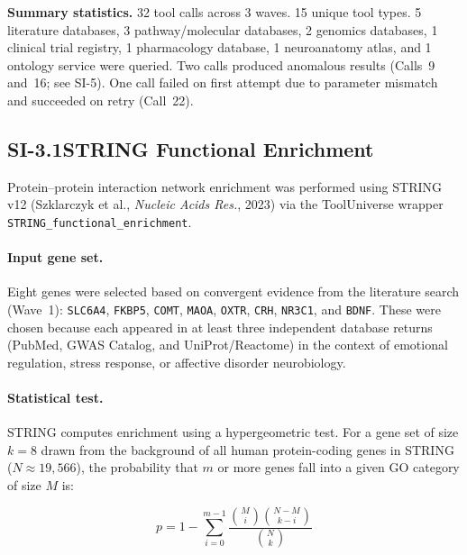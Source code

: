 \noindent
\textbf{Summary statistics.}
32 tool calls across 3 waves.  15 unique tool types.  5 literature databases,
3 pathway/molecular databases, 2 genomics databases, 1 clinical trial
registry, 1 pharmacology database, 1 neuroanatomy atlas, and 1 ontology
service were queried.  Two calls produced anomalous results (Calls~9 and~16;
see SI-5).  One call failed on first attempt due to parameter mismatch and
succeeded on retry (Call~22).


\subsection*{SI-3.1\quad STRING Functional Enrichment}

Protein--protein interaction network enrichment was performed using STRING
v12 (Szklarczyk et al., \textit{Nucleic Acids Res.}, 2023) via the ToolUniverse wrapper
\texttt{STRING\_functional\_enrichment}.

\paragraph{Input gene set.}
Eight genes were selected based on convergent evidence from the literature
search (Wave~1): \texttt{SLC6A4}, \texttt{FKBP5}, \texttt{COMT},
\texttt{MAOA}, \texttt{OXTR}, \texttt{CRH}, \texttt{NR3C1}, and
\texttt{BDNF}.  These were chosen because each appeared in at least three
independent database returns (PubMed, GWAS Catalog, and UniProt/Reactome)
in the context of emotional regulation, stress response, or affective
disorder neurobiology.

\paragraph{Statistical test.}
STRING computes enrichment using a hypergeometric test.  For a gene set of
size $k = 8$ drawn from the background of all human protein-coding genes
in STRING ($N \approx 19{,}566$), the probability that $m$ or more genes
fall into a given GO category of size $M$ is:

\begin{equation}
  p = 1 - \sum_{i=0}^{m-1} \frac{\binom{M}{i}\binom{N-M}{k-i}}{\binom{N}{k}}
\end{equation}


